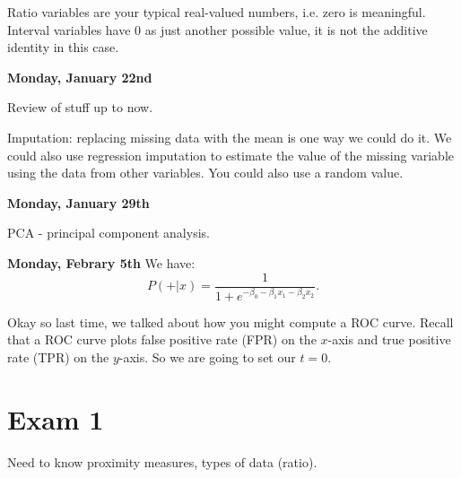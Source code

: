 \documentclass{amsbook}
\theoremstyle{plain}
\numberwithin{section}{chapter}
\numberwithin{equation}{chapter}
\theoremstyle{definition}
\theoremstyle{remark}
\newcommand{\fracc}{\frac}
\begin{document}
Ratio variables are your typical real-valued numbers, i.e. zero is meaningful. Interval variables have 0 as just another possible value, it is not the additive identity in this case. 


\textbf{Monday, January 22nd}

Review of stuff up to now. 


Imputation: replacing missing data with the mean is one way we could do it. We could also use regression imputation to estimate the value of the missing variable using the data from other variables. You could also use a random value. 

\textbf{Monday, January 29th}

PCA - principal component analysis. 

\textbf{Monday, Febrary 5th}
We have: 
$$
P(+ | x) = \fracc{1}{1 + e^{-\beta_0 - \beta_1x_1 - \beta_2x_2}}.
$$

Okay so last time, we talked about how you might compute a ROC curve. Recall that a ROC curve plots false positive rate (FPR) on the $x$-axis and true positive rate (TPR) on the $y$-axis. So we are going to set our $t = 0$.



\section{Exam 1}

Need to know proximity measures, types of data (ratio). 
\end{document}
